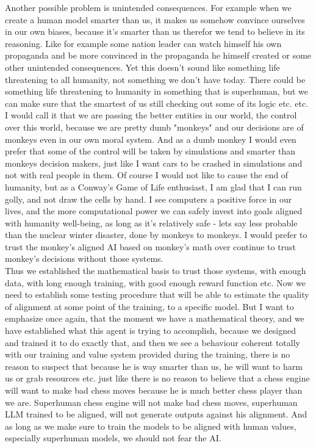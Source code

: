 \documentclass{article}
\begin{document}
Another possible problem is unintended consequences. For example when we create a human model smarter than us, it makes us somehow convince ourselves in our own biases, because it's smarter than us therefor we tend to believe in its reasoning. Like for example some nation leader can watch himself his own propaganda and be more convinced in the propaganda he himself created or some other unintended consequences. Yet this doesn't sound like something life threatening to all humanity, not something we don't have today. There could be something life threatening to humanity in something that is superhuman, but we can make sure that the smartest of us still checking out some of its logic etc. etc. I would call it that we are passing the better entities in our world, the control over this world, because we are pretty dumb "monkeys" and our decisions are of monkeys even in our own moral system. And as a dumb monkey I would even prefer that some of the control will be taken by simulations and smarter than monkeys decision makers, just like I want cars to be crashed in simulations and not with real people in them. Of course I would not like to cause the end of humanity, but as a Conway's Game of Life enthusiast\cite{simkin}, I am glad that I can run golly\cite{golly}, and not draw the cells by hand. I see computers a positive force in our lives, and the more computational power we can safely invest into  goals aligned with humanity well-being, as long as it's relatively safe - lets say less probable than the nuclear winter disaster, done by monkeys to monkeys. I would prefer to trust the monkey's aligned AI based on monkey's math over continue to trust monkey's decisions without those systems.\\

Thus we established the mathematical basis to trust those systems, with enough data, with long enough training, with good enough reward function etc. Now we need to establish some testing procedure that will be able to estimate the quality of alignment at some point of the training, to a specific model. But I want to emphasize once again, that the moment we have a mathematical theory, and we have established what this agent is trying to accomplish, because we designed and trained it to do exactly that, and then we see a behaviour coherent totally with our training and value system provided during the training, there is no reason to suspect that because he is way smarter than us, he will want to harm us or grab resources etc. just like there is no reason to believe that a chess engine will want to make bad chess moves because he is much better chess player than we are. Superhuman chess engine will not make bad chess moves, superhuman LLM trained to be aligned, will not generate outputs against his alignment. And as long as we make sure to train the models to be aligned with human values, especially superhuman models, we should not fear the AI.\\
\end{document}
